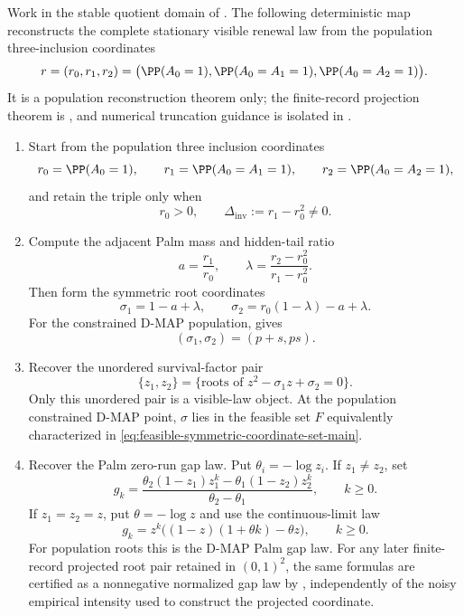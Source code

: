\begin{proposition}\label{lem:algorithmic-complete-law-reconstruction-main}
Work in the stable quotient domain of
.  The following deterministic
map reconstructs the complete stationary visible renewal law from the
population three-inclusion coordinates
\[
r=(r_0,r_1,r_2)
=\bigl(\PP(A_0=1),\PP(A_0=A_1=1),\PP(A_0=A_2=1)\bigr).
\]
It is a population reconstruction theorem only; the finite-record projection
theorem is ,
and numerical truncation guidance is isolated in
.

\begin{enumerate}
\item Start from the population three inclusion coordinates
\[
r_0=\PP(A_0=1),\qquad
r_1=\PP(A_0=A_1=1),\qquad
r_2=\PP(A_0=A_2=1),
\]
and retain the triple only when
\[
r_0>0,\qquad \Delta_{\mathrm{inv}}:=r_1-r_0^2\ne0 .
\]

\item Compute the adjacent Palm mass and hidden-tail ratio
\[
a=\frac{r_1}{r_0},\qquad
\lambda=\frac{r_2-r_0^2}{r_1-r_0^2}.
\]
Then form the symmetric root coordinates
\begin{equation}\label{eq:algorithmic-reconstruction-sigma-main}
\sigma_1=1-a+\lambda,\qquad
\sigma_2=r_0(1-\lambda)-a+\lambda .
\end{equation}
For the constrained D-MAP population,
 gives
\[
(\sigma_1,\sigma_2)=(p+s,ps).
\]

\item Recover the unordered survival-factor pair
\[
\{z_1,z_2\}
=\{ \text{roots of } z^2-\sigma_1z+\sigma_2=0\}.
\]
Only this unordered pair is a visible-law object.  At the population
constrained D-MAP point, \(\sigma\) lies in the feasible set \(F\) equivalently
characterized in \eqref{eq:feasible-symmetric-coordinate-set-main}.

\item Recover the Palm zero-run gap law.  Put
\(\theta_i=-\log z_i\).  If \(z_1\ne z_2\), set
\begin{equation}\label{eq:algorithmic-reconstruction-gap-main}
g_k=
\frac{\theta_2(1-z_1)z_1^k-\theta_1(1-z_2)z_2^k}
     {\theta_2-\theta_1},
\qquad k\ge0 .
\end{equation}
If \(z_1=z_2=z\), put \(\theta=-\log z\) and use the continuous-limit law
\begin{equation}\label{eq:algorithmic-reconstruction-gap-diagonal-main}
g_k=z^k\bigl((1-z)(1+\theta k)-\theta z\bigr),
\qquad k\ge0 .
\end{equation}
For population roots this is the D-MAP Palm gap law.  For any later
finite-record projected root pair retained in \((0,1)^2\), the same formulas
are certified as a nonnegative normalized gap law by
, independently of the noisy
empirical intensity used to construct the projected coordinate.


\end{enumerate}
\end{proposition}
